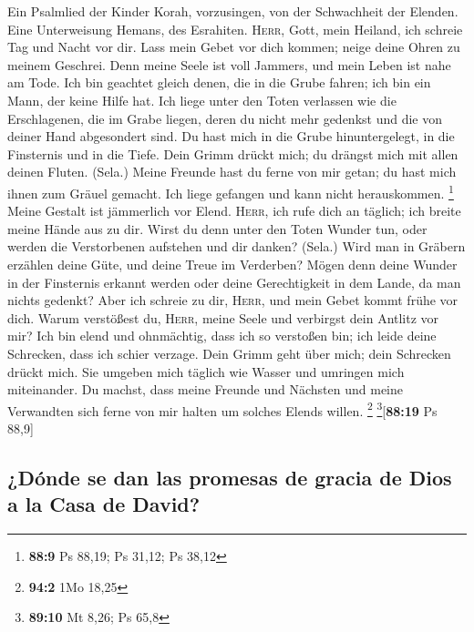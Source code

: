  Ein Psalmlied der Kinder Korah, vorzusingen, von der
Schwachheit der Elenden. Eine Unterweisung Hemans, des Esrahiten.
 \textsc{Herr}, Gott, mein Heiland, ich schreie Tag und
Nacht vor dir.  Lass mein Gebet vor dich kommen; neige
deine Ohren zu meinem Geschrei.  Denn meine Seele ist voll
Jammers, und mein Leben ist nahe am Tode.  Ich bin
geachtet gleich denen, die in die Grube fahren; ich bin ein Mann, der
keine Hilfe hat.  Ich liege unter den Toten verlassen wie
die Erschlagenen, die im Grabe liegen, deren du nicht mehr gedenkst und
die von deiner Hand abgesondert sind.  Du hast mich in die
Grube hinuntergelegt, in die Finsternis und in die Tiefe. 
Dein Grimm drückt mich; du drängst mich mit allen deinen Fluten. (Sela.)
 Meine Freunde hast du ferne von mir getan; du hast mich
ihnen zum Gräuel gemacht. Ich liege gefangen und kann nicht
herauskommen. \footnote{\textbf{88:9} Ps 88,19; Ps 31,12; Ps 38,12}
 Meine Gestalt ist jämmerlich vor Elend. \textsc{Herr},
ich rufe dich an täglich; ich breite meine Hände aus zu dir.
 Wirst du denn unter den Toten Wunder tun, oder werden
die Verstorbenen aufstehen und dir danken? (Sela.)  Wird
man in Gräbern erzählen deine Güte, und deine Treue im Verderben?
 Mögen denn deine Wunder in der Finsternis erkannt werden
oder deine Gerechtigkeit in dem Lande, da man nichts gedenkt?
 Aber ich schreie zu dir, \textsc{Herr}, und mein Gebet
kommt frühe vor dich.  Warum verstößest du,
\textsc{Herr}, meine Seele und verbirgst dein Antlitz vor mir?
 Ich bin elend und ohnmächtig, dass ich so verstoßen bin;
ich leide deine Schrecken, dass ich schier verzage.  Dein
Grimm geht über mich; dein Schrecken drückt mich.  Sie
umgeben mich täglich wie Wasser und umringen mich miteinander.
 Du machst, dass meine Freunde und Nächsten und meine
Verwandten sich ferne von mir halten um solches Elends willen.
\footnote{\textbf{94:2} 1Mo 18,25} \footnote{\textbf{89:10} Mt 8,26; Ps
  65,8}{[}\textbf{88:19} Ps 88,9{]}

\hypertarget{duxf3nde-se-dan-las-promesas-de-gracia-de-dios-a-la-casa-de-david}{%
\subsection{¿Dónde se dan las promesas de gracia de Dios a la Casa de
David?}\label{duxf3nde-se-dan-las-promesas-de-gracia-de-dios-a-la-casa-de-david}}

